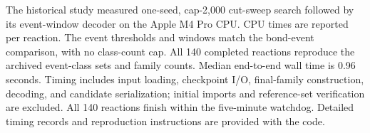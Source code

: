 The historical study measured one-seed, cap-2,000 cut-sweep search followed by its event-window decoder on the Apple M4 Pro CPU. CPU times are reported per reaction. The event thresholds and windows match the bond-event comparison, with no class-count cap. All 140 completed reactions reproduce the archived event-class sets and family counts. Median end-to-end wall time is 0.96 seconds. Timing includes input loading, checkpoint I/O, final-family construction, decoding, and candidate serialization; initial imports and reference-set verification are excluded. All 140 reactions finish within the five-minute watchdog. Detailed timing records and reproduction instructions are provided with the code.
